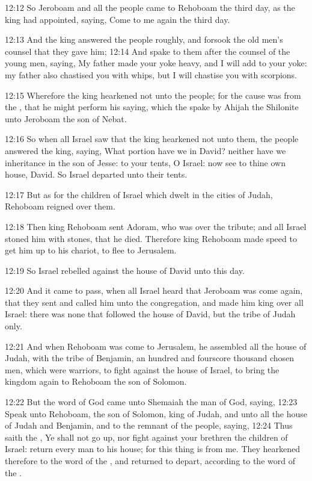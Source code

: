 12:12 So Jeroboam and all the people came to Rehoboam the third day,
as the king had appointed, saying, Come to me again the third day.

12:13 And the king answered the people roughly, and forsook the old
men's counsel that they gave him; 12:14 And spake to them after the
counsel of the young men, saying, My father made your yoke heavy, and
I will add to your yoke: my father also chastised you with whips, but
I will chastise you with scorpions.

12:15 Wherefore the king hearkened not unto the people; for the cause
was from the \LORD, that he might perform his saying, which the \LORD
spake by Ahijah the Shilonite unto Jeroboam the son of Nebat.

12:16 So when all Israel saw that the king hearkened not unto them,
the people answered the king, saying, What portion have we in David?
neither have we inheritance in the son of Jesse: to your tents, O
Israel: now see to thine own house, David. So Israel departed unto
their tents.

12:17 But as for the children of Israel which dwelt in the cities of
Judah, Rehoboam reigned over them.

12:18 Then king Rehoboam sent Adoram, who was over the tribute; and
all Israel stoned him with stones, that he died. Therefore king
Rehoboam made speed to get him up to his chariot, to flee to
Jerusalem.

12:19 So Israel rebelled against the house of David unto this day.

12:20 And it came to pass, when all Israel heard that Jeroboam was
come again, that they sent and called him unto the congregation, and
made him king over all Israel: there was none that followed the house
of David, but the tribe of Judah only.

12:21 And when Rehoboam was come to Jerusalem, he assembled all the
house of Judah, with the tribe of Benjamin, an hundred and fourscore
thousand chosen men, which were warriors, to fight against the house
of Israel, to bring the kingdom again to Rehoboam the son of Solomon.

12:22 But the word of God came unto Shemaiah the man of God, saying,
12:23 Speak unto Rehoboam, the son of Solomon, king of Judah, and unto
all the house of Judah and Benjamin, and to the remnant of the people,
saying, 12:24 Thus saith the \LORD, Ye shall not go up, nor fight
against your brethren the children of Israel: return every man to his
house; for this thing is from me. They hearkened therefore to the word
of the \LORD, and returned to depart, according to the word of the
\LORD.

